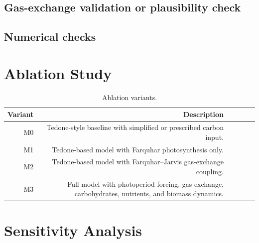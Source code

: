\documentclass[a4paper,fleqn]{cas-dc}
\begin{document}
\subsection{Gas-exchange validation or plausibility check}

\subsection{Numerical checks}

\section{Ablation Study}
\label{sec:ablation}


\begin{table}[ht]
\centering
\caption{Ablation variants.}
\label{tab:ablation_variants}
\begin{tabular}{rrrrr p{}}
\hline
\textbf{Variant} & \textbf{Description} \\
\hline
M0 & Tedone-style baseline with simplified or prescribed carbon input. \\
M1 & Tedone-based model with Farquhar photosynthesis only. \\
M2 & Tedone-based model with Farquhar--Jarvis gas-exchange coupling. \\
M3 & Full model with photoperiod forcing, gas exchange, carbohydrates, nutrients, and biomass dynamics. \\
\hline
\end{tabular}
\end{table}


\section{Sensitivity Analysis}
\label{sec:sensitivity}
\end{document}
